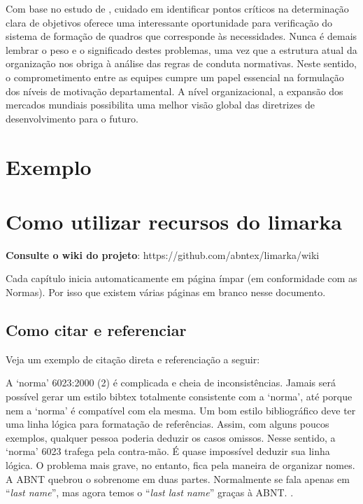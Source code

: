 \documentclass[
	12pt,				%
	oneside,			%
	a4paper,			%
	english,			%
	french,				%
	spanish,			%
	brazil				%
	]{abntex2}
\renewenvironment{quote}
  {\small\list{}{\rightmargin=0.1cm \leftmargin=4cm}%
   \item\relax}
  {\endlist}
\begin{document}
Com base no estudo de , cuidado em identificar
pontos críticos na determinação clara de objetivos oferece uma
interessante oportunidade para verificação do sistema de formação de
quadros que corresponde às necessidades. Nunca é demais lembrar o peso e
o significado destes problemas, uma vez que a estrutura atual da
organização nos obriga à análise das regras de conduta normativas. Neste
sentido, o comprometimento entre as equipes cumpre um papel essencial na
formulação dos níveis de motivação departamental. A nível
organizacional, a expansão dos mercados mundiais possibilita uma melhor
visão global das diretrizes de desenvolvimento para o futuro.

\hypertarget{exemplo}{%
\chapter{Exemplo}\label{exemplo}}

\hypertarget{como-utilizar-recursos-do-limarka}{%
\chapter{Como utilizar recursos do
limarka}\label{como-utilizar-recursos-do-limarka}}

\textbf{Consulte o wiki do projeto}:
https://github.com/abntex/limarka/wiki

Cada capítulo inicia automaticamente em página ímpar (em conformidade
com as Normas). Por isso que existem várias páginas em branco nesse
documento.

\hypertarget{como-citar-e-referenciar}{%
\section{Como citar e referenciar}\label{como-citar-e-referenciar}}

Veja um exemplo de citação direta e referenciação a seguir:

\begin{quote}
A `norma' 6023:2000 (2) é complicada e cheia de inconsistências. Jamais
será possível gerar um estilo bibtex totalmente consistente com a
`norma', até porque nem a `norma' é compatível com ela mesma. Um bom
estilo bibliográfico deve ter uma linha lógica para formatação de
referências. Assim, com alguns poucos exemplos, qualquer pessoa poderia
deduzir os casos omissos. Nesse sentido, a `norma' 6023 trafega pela
contra-mão. É quase impossível deduzir sua linha lógica. O problema mais
grave, no entanto, fica pela maneira de organizar nomes. A ABNT quebrou
o sobrenome em duas partes. Normalmente se fala apenas em ``\emph{last
name}'', mas agora temos o ``\emph{last last name}'' graças à ABNT.
\cite[p. 5]{abntex2cite}.
\end{quote}
\end{document}
